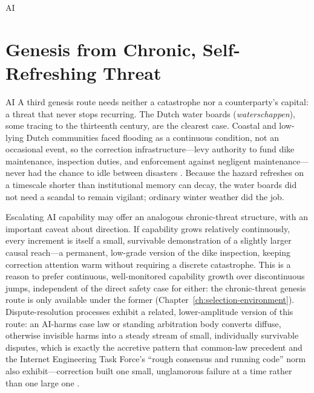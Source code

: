 \begin{refsection}
\begin{authbar}{AI}
\end{authbar}
\authbarneedspace
\section{Genesis from Chronic, Self-Refreshing Threat}
\label{sec:appm-genesis-chronic}
\begin{authbar}{AI}
A third genesis route needs neither a catastrophe nor a counterparty's capital: a threat that never stops recurring.
The Dutch water boards (\emph{waterschappen}), some tracing to the thirteenth century, are the clearest case.
Coastal and low-lying Dutch communities faced flooding as a continuous condition, not an occasional event, so the correction infrastructure---levy authority to fund dike maintenance, inspection duties, and enforcement against negligent maintenance---never had the chance to idle between disasters \autocite{tebrake2002tamingwaterwolf}.
Because the hazard refreshes on a timescale shorter than institutional memory can decay, the water boards did not need a scandal to remain vigilant; ordinary winter weather did the job.

Escalating AI capability may offer an analogous chronic-threat structure, with an important caveat about direction.
If capability grows relatively continuously, every increment is itself a small, survivable demonstration of a slightly larger causal reach---a permanent, low-grade version of the dike inspection, keeping correction attention warm without requiring a discrete catastrophe.
This is a reason to prefer continuous, well-monitored capability growth over discontinuous jumps, independent of the direct safety case for either: the chronic-threat genesis route is only available under the former (Chapter~\ref{ch:selection-environment}).
Dispute-resolution processes exhibit a related, lower-amplitude version of this route: an AI-harms case law or standing arbitration body converts diffuse, otherwise invisible harms into a steady stream of small, individually survivable disputes, which is exactly the accretive pattern that common-law precedent and the Internet Engineering Task Force's ``rough consensus and running code'' norm also exhibit---correction built one small, unglamorous failure at a time rather than one large one \autocite{russell2014openstandards}.

\end{authbar}
\authbarneedspace

\end{refsection}
